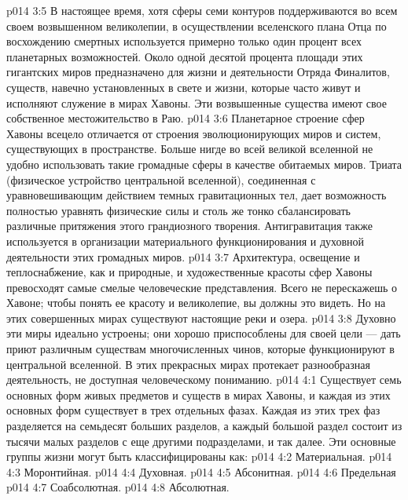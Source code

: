 \vs p014 3:5 В настоящее время, хотя сферы семи контуров поддерживаются во всем своем возвышенном великолепии, в осуществлении вселенского плана Отца по восхождению смертных используется примерно только один процент всех планетарных возможностей. Около одной десятой процента площади этих гигантских миров предназначено для жизни и деятельности Отряда Финалитов, существ, навечно установленных в свете и жизни, которые часто живут и исполняют служение в мирах Хавоны. Эти возвышенные существа имеют свое собственное местожительство в Раю.
\vs p014 3:6 Планетарное строение сфер Хавоны всецело отличается от строения эволюционирующих миров и систем, существующих в пространстве. Больше нигде во всей великой вселенной не удобно использовать такие громадные сферы в качестве обитаемых миров. Триата (физическое устройство центральной вселенной), соединенная с уравновешивающим действием темных гравитационных тел, дает возможность полностью уравнять физические силы и столь же тонко сбалансировать различные притяжения этого грандиозного творения. Антигравитация также используется в организации материального функционирования и духовной деятельности этих громадных миров.
\vs p014 3:7 Архитектура, освещение и теплоснабжение, как и природные, и художественные красоты сфер Хавоны превосходят самые смелые человеческие представления. Всего не перескажешь о Хавоне; чтобы понять ее красоту и великолепие, вы должны это видеть. Но на этих совершенных мирах существуют настоящие реки и озера.
\vs p014 3:8 Духовно эти миры идеально устроены; они хорошо приспособлены для своей цели --- дать приют различным существам многочисленных чинов, которые функционируют в центральной вселенной. В этих прекрасных мирах протекает разнообразная деятельность, не доступная человеческому пониманию.
\vs p014 4:1 Существует семь основных форм живых предметов и существ в мирах Хавоны, и каждая из этих основных форм существует в трех отдельных фазах. Каждая из этих трех фаз разделяется на семьдесят больших разделов, а каждый большой раздел состоит из тысячи малых разделов с еще другими подразделами, и так далее. Эти основные группы жизни могут быть классифицированы как:
\vs p014 4:2 \bibnobreakspace Материальная.
\vs p014 4:3 \bibnobreakspace Моронтийная.
\vs p014 4:4 \bibnobreakspace Духовная.
\vs p014 4:5 \bibnobreakspace Абсонитная.
\vs p014 4:6 \bibnobreakspace Предельная
\vs p014 4:7 \bibnobreakspace Соабсолютная.
\vs p014 4:8 \bibnobreakspace Абсолютная.
